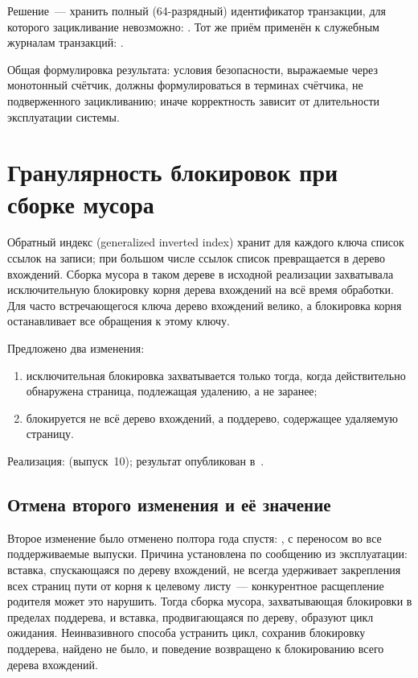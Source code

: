 Решение~--- хранить полный (64-разрядный) идентификатор транзакции, для
которого зацикливание невозможно: . Тот же приём применён к
служебным журналам транзакций: .

Общая формулировка результата: условия безопасности, выражаемые через
монотонный счётчик, должны формулироваться в терминах счётчика, не
подверженного зацикливанию; иначе корректность зависит от длительности
эксплуатации системы.

\section{Гранулярность блокировок при сборке мусора}
\label{sec:gin-locks}

Обратный индекс (generalized inverted index) хранит для каждого ключа список
ссылок на записи; при большом числе ссылок список превращается в дерево
вхождений. Сборка мусора в таком дереве в исходной реализации захватывала
исключительную блокировку корня дерева вхождений на всё время обработки. Для
часто встречающегося ключа дерево вхождений велико, а блокировка корня
останавливает все обращения к этому ключу.

Предложено два изменения:

\begin{enumerate}
\item исключительная блокировка захватывается только тогда, когда действительно
      обнаружена страница, подлежащая удалению, а не заранее;
\item блокируется не всё дерево вхождений, а поддерево, содержащее удаляемую
      страницу.
\end{enumerate}

Реализация: 
(выпуск~10); результат опубликован в~\cite{borodin2018gin}.

\subsection{Отмена второго изменения и её значение}
\label{sec:gin-revert}

Второе изменение было отменено полтора года спустя:
,
с переносом во все поддерживаемые выпуски. Причина установлена по сообщению из
эксплуатации: вставка, спускающаяся по дереву вхождений, не всегда удерживает
закрепления всех страниц пути от корня к целевому листу~--- конкурентное
расщепление родителя может это нарушить. Тогда сборка мусора, захватывающая
блокировки в пределах поддерева, и вставка, продвигающаяся по дереву, образуют
цикл ожидания. Неинвазивного способа устранить цикл, сохранив блокировку
поддерева, найдено не было, и поведение возвращено к блокированию всего дерева
вхождений.

